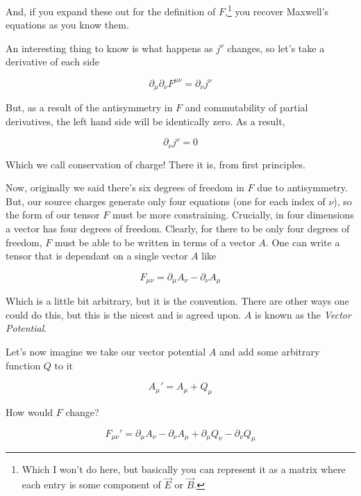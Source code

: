 \documentclass{article}
\begin{document}
And, if you expand these out for the definition of $F$,\footnote{Which I won't do here, but basically you can represent it as a matrix where each entry is some component of $\vec{E}$ or $\vec{B}$.} you recover Maxwell's equations as you know them.

An interesting thing to know is what happens as $j^\nu$ changes, so let's take a derivative of each side

\begin{equation}
    \partial_\mu \partial_\nu F^{\mu\nu} = \partial_\nu j^\nu
\end{equation}

But, as a result of the antisymmetry in $F$ and commutability of partial derivatives, the left hand side will be identically zero. As a result,

\begin{equation}
    \partial_\nu j^\nu = 0
\end{equation}

Which we call conservation of charge! There it is, from first principles. 

Now, originally we said there's six degrees of freedom in $F$ due to antisymmetry. But, our source charges generate only four equations (one for each index of $\nu$), so the form of our tensor $F$ must be more constraining. Crucially, in four dimensions a vector has four degrees of freedom. Clearly, for there to be only four degrees of freedom, $F$ must be able to be written in terms of a vector $A$. One can write a tensor that is dependant on a single vector $A$ like

\begin{equation}
    F_{\mu\nu} = \partial_\mu A_\nu - \partial_\nu A_\mu
\end{equation}

Which is a little bit arbitrary, but it is the convention. There are other ways one could do this, but this is the nicest and is agreed upon. $A$ is known as the \textit{Vector Potential}.

Let's now imagine we take our vector potential $A$ and add some arbitrary function $Q$ to it

\begin{equation}
    A_\mu' = A_\mu + Q_\mu
\end{equation}

How would $F$ change?

\begin{equation}
    F_{\mu\nu}' = \partial_\mu A_\nu - \partial_\nu A_\mu + \partial_\mu Q_\nu - \partial_\nu Q_\mu
\end{equation}
\end{document}
